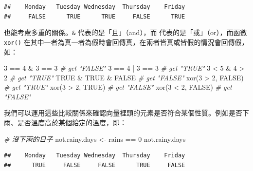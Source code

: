 \documentclass[
]{book}
\newenvironment{Shaded}{\begin{snugshade}}{\end{snugshade}}
\newcommand{\CommentTok}[1]{\textcolor[rgb]{0.56,0.35,0.01}{\textit{#1}}}
\newcommand{\ConstantTok}[1]{\textcolor[rgb]{0.00,0.00,0.00}{#1}}
\newcommand{\DecValTok}[1]{\textcolor[rgb]{0.00,0.00,0.81}{#1}}
\newcommand{\FunctionTok}[1]{\textcolor[rgb]{0.00,0.00,0.00}{#1}}
\newcommand{\NormalTok}[1]{#1}
\newcommand{\OtherTok}[1]{\textcolor[rgb]{0.56,0.35,0.01}{#1}}
\newcommand{\SpecialCharTok}[1]{\textcolor[rgb]{0.00,0.00,0.00}{#1}}
\theoremstyle{definition}
\theoremstyle{remark}
\begin{document}
\begin{verbatim}
##    Monday   Tuesday Wednesday  Thursday    Friday 
##     FALSE      TRUE      TRUE     FALSE      TRUE
\end{verbatim}

也能考慮多重的關係。\texttt{\&} 代表的是「且」（and），而 \texttt{\textbar{}} 代表的是「或」（or），而函數 \texttt{xor()} 在其中一者為真一者為假時會回傳真，在兩者皆真或皆假的情況會回傳假，如：

\begin{Shaded}
\begin{Highlighting}[]
\DecValTok{3} \SpecialCharTok{==} \DecValTok{4} \SpecialCharTok{\&} \DecValTok{3} \SpecialCharTok{==} \DecValTok{3}  \CommentTok{\# get "FALSE"}
\DecValTok{3} \SpecialCharTok{==} \DecValTok{4} \SpecialCharTok{|} \DecValTok{3} \SpecialCharTok{==} \DecValTok{3}  \CommentTok{\# get "TRUE"}
\DecValTok{3} \SpecialCharTok{\textless{}} \DecValTok{5} \SpecialCharTok{\&} \DecValTok{4} \SpecialCharTok{\textgreater{}} \DecValTok{2}  \CommentTok{\# get "TRUE"}
\ConstantTok{TRUE} \SpecialCharTok{\&} \ConstantTok{TRUE} \SpecialCharTok{\&} \ConstantTok{FALSE}  \CommentTok{\# get "FALSE"}
\FunctionTok{xor}\NormalTok{(}\DecValTok{3} \SpecialCharTok{\textgreater{}} \DecValTok{2}\NormalTok{, }\ConstantTok{FALSE}\NormalTok{)  }\CommentTok{\# get "TRUE"}
\FunctionTok{xor}\NormalTok{(}\DecValTok{3} \SpecialCharTok{\textgreater{}} \DecValTok{2}\NormalTok{, }\ConstantTok{TRUE}\NormalTok{)  }\CommentTok{\# get "FALSE"}
\FunctionTok{xor}\NormalTok{(}\DecValTok{3} \SpecialCharTok{\textless{}} \DecValTok{2}\NormalTok{, }\ConstantTok{FALSE}\NormalTok{)  }\CommentTok{\# get "FALSE"}
\end{Highlighting}
\end{Shaded}

我們可以運用這些比較關係來確認向量裡頭的元素是否符合某個性質。例如是否下雨、是否溫度高於某個給定的溫度，即：

\begin{Shaded}
\begin{Highlighting}[]
\CommentTok{\# 沒下雨的日子}
\NormalTok{not.rainy.days }\OtherTok{\textless{}{-}}\NormalTok{ rains }\SpecialCharTok{==} \DecValTok{0}
\NormalTok{not.rainy.days}
\end{Highlighting}
\end{Shaded}

\begin{verbatim}
##    Monday   Tuesday Wednesday  Thursday    Friday 
##      TRUE     FALSE     FALSE      TRUE     FALSE
\end{verbatim}
\end{document}
